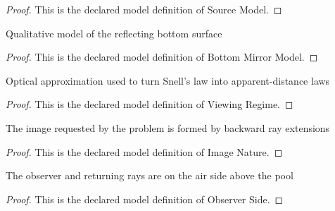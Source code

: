\begin{proof}
  This is the declared model definition of Source Model.
\end{proof}
\begin{definition}
  \label{def:physics:phyx-mini-0161:phyxminiproblems-problemphyxmini0161-bottommirrormodel}
  Qualitative model of the reflecting bottom surface
\end{definition}
\begin{proof}
  This is the declared model definition of Bottom Mirror Model.
\end{proof}
\begin{definition}
  \label{def:physics:phyx-mini-0161:phyxminiproblems-problemphyxmini0161-viewingregime}
  Optical approximation used to turn Snell's law into apparent-distance laws
\end{definition}
\begin{proof}
  This is the declared model definition of Viewing Regime.
\end{proof}
\begin{definition}
  \label{def:physics:phyx-mini-0161:phyxminiproblems-problemphyxmini0161-imagenature}
  The image requested by the problem is formed by backward ray extensions
\end{definition}
\begin{proof}
  This is the declared model definition of Image Nature.
\end{proof}
\begin{definition}
  \label{def:physics:phyx-mini-0161:phyxminiproblems-problemphyxmini0161-observerside}
  The observer and returning rays are on the air side above the pool
\end{definition}
\begin{proof}
  This is the declared model definition of Observer Side.
\end{proof}
